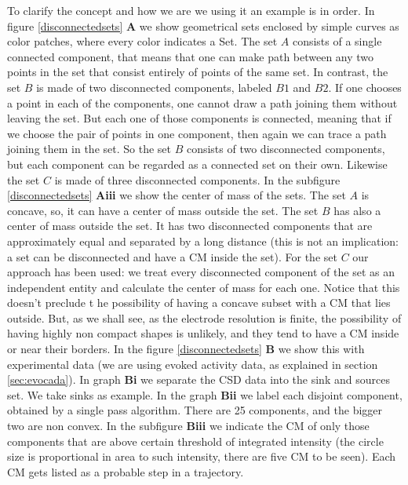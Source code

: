 \documentclass[11pt, letterpaper]{article}
\begin{document}
To clarify the concept and how we are we using it an example is in order. In figure \ref{disconnectedsets} \textbf{A} we show geometrical sets enclosed by simple curves as color patches, where every color indicates a Set. The set $A$ consists of a single connected component, that means that one can make  path between any two points in the set that consist entirely of points of the same set. In contrast, the set $B$ is made of two disconnected components, labeled $B1$ and $B2$. If one chooses a point in each of the components, one cannot draw a path joining them without leaving the set. But each one of those components is connected, meaning that if we choose the pair of points in one component, then again we can trace a path joining them in the set. So the set $B$ consists of two disconnected components, but each component can be regarded as a connected set on their own. Likewise the set $C$ is made of three disconnected components. In the subfigure \ref{disconnectedsets} \textbf{Aiii} we show the center of mass of the sets. The set $A$ is concave, so, it can have a center of mass outside the set. The
set $B$ has also a center of mass outside the set. It has two disconnected components that are approximately
equal and separated by a long distance (this is not an implication: a set can be disconnected and have
a CM inside the set). For the set $C$ our approach has been used: we treat every disconnected component of the
set as an independent entity and calculate the center of mass for each one. Notice that this doesn't preclude t
he possibility of having a concave subset with a CM that lies outside. But, as we shall see,
as the electrode resolution is finite, the possibility of having highly non compact shapes is unlikely, and they
tend to have a CM inside or near their borders. In the figure \ref{disconnectedsets}
\textbf{B} we show this with experimental
data (we are using evoked activity data, as explained in section \ref{sec:evocada}). In graph
\textbf{Bi} we
separate the CSD data into the sink and sources set. We take sinks as example. In the graph
\textbf{Bii}
we label each disjoint component, obtained by a single pass algorithm. There are 25 components, and
the bigger two are non convex. In the
subfigure \textbf{Biii}
we indicate the CM of only those components that are above certain threshold of
integrated intensity (the circle size  is proportional in area to such intensity, there are five CM to be
seen). Each CM gets listed as a probable step in a trajectory.
\end{document}
